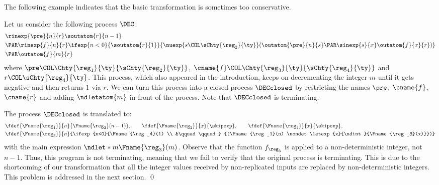 The following example indicates that the basic transformation is
sometimes too conservative.
\begin{example}
  \label{ex:weakeness-of-basic-transformation}
Let us consider the following process \( \DEC \):
\begin{align*}
    &\rinexp{\pre}{n}{r} \soutatom{r}{n-1} \\
    & \PAR \rinexp{f}{n}{r} \ifexp{n<0}{ \soutatom{r}{1} }{ \nuexp{s \COL \sChty{\reg_2}{\ty} } (\outatom{\pre}{n}{s} \PAR \sinexp{s}{x}\outatom{f}{x}{r}) } \\
    &\PAR \outatom{f}{m}{r}
\end{align*}
where
\( \pre\COL \Chty{\reg_1}{\ty}{\sChty{\reg_2}{\ty}} \), \(\cname{f} \COL \Chty{\reg_3}{\ty}{\sChty{\reg_4}{\ty}} \) and \( r \COL \sChty{\reg_4}{\ty}\).
This process, which also appeared in the introduction, keeps on decrementing the integer \( m \) until it gets negative and then returns \( 1 \) via \( r \).
We can turn this process into a closed process \( \DECclosed \) by restricting the names \( \pre \), \( \cname{f} \), \( \cname{r} \) and adding \( \ndletatom{m} \) in front of the process.
Note that \( \DECclosed \) is terminating.

The process \( \DECclosed \) is translated to:
\begin{align*}
  &\fdef{\Fname{\reg_1}}{n}{\Fname{\reg_2}(n-1)}, 
  \qquad \fdef{\Fname{\reg_2}}{x}{\skipexp},
  \qquad \fdef{\Fname{\reg_4}}{x}{\skipexp}, \\
  & \fdef{\Fname{\reg_3}}{n}{\ifexp{n<0}{\Fname{\reg_4}(1) \\ &\qquad\qquad }
            {(\Fname{\reg_1}(n) \nondet \letexp{x}{\ndint}{\Fname{\reg_3}(x)}})}
\end{align*}
with the main expression \( \ndlet*{m}{\Fname{\reg_3}(m)} \).
Observe that the function \( f_{\reg_3}\) is applied to a non-deterministic integer, not \( n - 1\).
Thus, this program is not terminating, meaning that we fail to verify that the original process is terminating.
This is due to the shortcoming of our transformation that all the integer   values received by non-replicated inputs are replaced by non-deterministic integers.
This problem is addressed in the next section.
\qed
\end{example}

